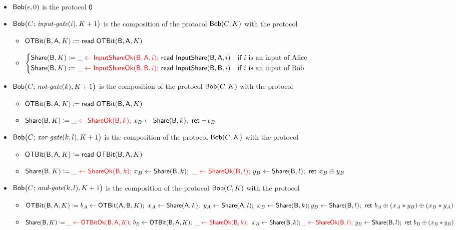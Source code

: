 \begin{itemize}
\item $\mathsf{Bob}(\epsilon,0)$ is the protocol $\mathsf{0}$
\item $\mathsf{Bob}\big(C; \, \textit{input-gate}(i),K+1\big)$ is the composition of the protocol $\mathsf{Bob}(C,K)$ with the protocol
\begin{itemize}
\item $\mathsf{OTBit}(\mathsf{B},\mathsf{A},K) \coloneqq \mathsf{read} \ \mathsf{OTBit}(\mathsf{B},\mathsf{A},K)$
\item $\begin{cases*} \Share(\B,K) \coloneqq {\color{red} \_ \leftarrow \InputShareOk(\B,\A,i); \ } \read{\InputShare(\B,\A,i)} & \text{if $i$ is an input of Alice} \\ \Share(\B,K) \coloneqq {\color{red} \_ \leftarrow \InputShareOk(\B,\B,i); \ } \read{\InputShare(\B,\B,i)} & \text{if $i$ is an input of Bob} \end{cases*}$
\end{itemize}
\item $\mathsf{Bob}\big(C; \, \textit{not-gate}(k),K+1\big)$ is the composition of the protocol $\mathsf{Bob}(C,K)$ with the protocol
\begin{itemize}
\item $\mathsf{OTBit}(\mathsf{B},\mathsf{A},K) \coloneqq \mathsf{read} \ \mathsf{OTBit}(\mathsf{B},\mathsf{A},K)$
\item $\mathsf{Share}(\mathsf{B},K) \coloneqq {\color{red} \_ \leftarrow \mathsf{ShareOk}(\mathsf{B},k); \ } x_B \leftarrow \mathsf{Share}(\mathsf{B},k); \ \mathsf{ret} \ \neg x_B$
\end{itemize}
\item $\mathsf{Bob}\big(C; \, \textit{xor-gate}(k,l),K+1\big)$ is the composition of the protocol $\mathsf{Bob}(C,K)$ with the protocol
\begin{itemize}
\item $\mathsf{OTBit}(\mathsf{B},\mathsf{A},K) \coloneqq \mathsf{read} \ \mathsf{OTBit}(\mathsf{B},\mathsf{A},K)$
\item $\Share(\B,K) \coloneqq {\color{red} \_ \leftarrow \ShareOk(\B,k); \ } x_B \leftarrow \Share(\B,k); \ {\color{red} \_ \leftarrow \ShareOk(\B,l); \ } y_B \leftarrow \Share(\B,l); \ \ret{x_B \oplus y_B}$
\end{itemize}
\item $\mathsf{Bob}\big(C; \, \textit{and-gate}(k,l),K+1\big)$ is the composition of the protocol $\mathsf{Bob}(C,K)$ with the protocol
\begin{itemize}
\item $\mathsf{OTBit}(\mathsf{B},\mathsf{A},K) \coloneqq b_A \leftarrow \mathsf{OTBit}(\mathsf{A},\mathsf{B},K); \ x_A \leftarrow \mathsf{Share}(\mathsf{A},k); \ y_A \leftarrow \mathsf{Share}(\mathsf{A},l); \ x_B \leftarrow \mathsf{Share}(\mathsf{B},k); \\ y_B \leftarrow \mathsf{Share}(\mathsf{B},l); \ \mathsf{ret} \ b_A \oplus (x_A * y_B) \oplus (x_B * y_A)$
\item $\Share(\B,K) \coloneqq {\color{red} \_ \leftarrow \OTBitOk(\B,\A,K); \ } b_B \leftarrow \OTBit(\B,\A,K); \ {\color{red} \_ \leftarrow \ShareOk(\B,k); \ } \ x_B \leftarrow \Share(\B,k); \\ {\color{red} \_ \leftarrow \ShareOk(\B,l); \ } y_B \leftarrow \Share(\B,l); \ \ret{b_B \oplus (x_B * y_B)}$
\end{itemize}
\end{itemize}

